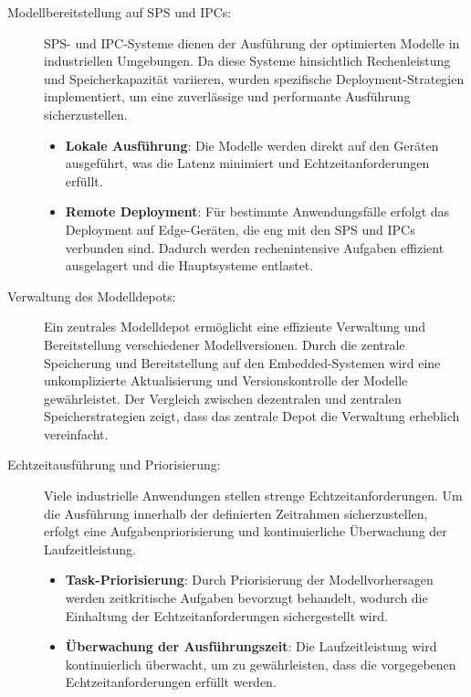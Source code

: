 \begin{description}
    \item[Modellbereitstellung auf SPS und IPCs:] SPS- und IPC-Systeme dienen der Ausführung der optimierten Modelle in industriellen Umgebungen. 
    Da diese Systeme hinsichtlich Rechenleistung und Speicherkapazität variieren, wurden spezifische Deployment-Strategien implementiert, 
    um eine zuverlässige und performante Ausführung sicherzustellen.
    \begin{itemize}
        \item \textbf{Lokale Ausführung}: Die Modelle werden direkt auf den Geräten ausgeführt, was die Latenz minimiert und Echtzeitanforderungen erfüllt.
        \item \textbf{Remote Deployment}: Für bestimmte Anwendungsfälle erfolgt das Deployment auf Edge-Geräten, die eng mit den SPS und IPCs verbunden sind. 
        Dadurch werden rechenintensive Aufgaben effizient ausgelagert und die Hauptsysteme entlastet.
    \end{itemize}
    
    \item[Verwaltung des Modelldepots:] Ein zentrales Modelldepot ermöglicht eine effiziente Verwaltung und Bereitstellung verschiedener Modellversionen. 
    Durch die zentrale Speicherung und Bereitstellung auf den Embedded-Systemen wird eine unkomplizierte Aktualisierung und Versionskontrolle der Modelle gewährleistet. 
    Der Vergleich zwischen dezentralen und zentralen Speicherstrategien zeigt, dass das zentrale Depot die Verwaltung erheblich vereinfacht.

    \item[Echtzeitausführung und Priorisierung:] Viele industrielle Anwendungen stellen strenge Echtzeitanforderungen. Um die Ausführung innerhalb der 
    definierten Zeitrahmen sicherzustellen, erfolgt eine Aufgabenpriorisierung und kontinuierliche Überwachung der Laufzeitleistung.
    \begin{itemize}
        \item \textbf{Task-Priorisierung}: Durch Priorisierung der Modellvorhersagen werden zeitkritische Aufgaben bevorzugt behandelt, 
        wodurch die Einhaltung der Echtzeitanforderungen sichergestellt wird.
        \item \textbf{Überwachung der Ausführungszeit}: Die Laufzeitleistung wird kontinuierlich überwacht, um zu gewährleisten, 
        dass die vorgegebenen Echtzeitanforderungen erfüllt werden.
    \end{itemize}
    

\end{description}

